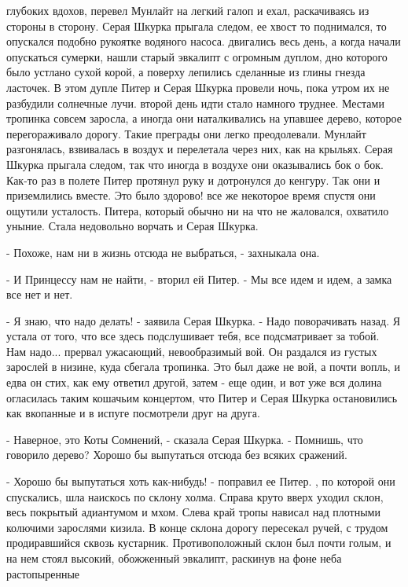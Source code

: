 глубоких вдохов, перевел Мунлайт на легкий галоп и ехал, раскачиваясь 
из стороны в сторону. Серая Шкурка прыгала следом, ее хвост то 
поднимался, то опускался подобно рукоятке водяного насоса.
 двигались весь день, а когда начали опускаться сумерки, нашли 
старый эвкалипт с огромным дуплом, дно которого было устлано сухой 
корой, а поверху лепились сделанные из глины гнезда ласточек. В этом 
дупле Питер и Серая Шкурка провели ночь, пока утром их не разбудили 
солнечные лучи.
 второй день идти стало намного труднее. Местами тропинка совсем 
заросла, а иногда они наталкивались на упавшее дерево, которое 
перегораживало дорогу. Такие преграды они легко преодолевали. Мунлайт 
разгонялась, взвивалась в воздух и перелетала через них, как на 
крыльях. Серая Шкурка прыгала следом, так что иногда в воздухе они 
оказывались бок о бок. Как-то раз в полете Питер протянул руку и 
дотронулся до кенгуру. Так они и приземлились вместе. Это было 
здорово!
 все же некоторое время спустя они ощутили усталость. Питера, 
который обычно ни на что не жаловался, охватило уныние. Стала 
недовольно ворчать и Серая Шкурка.
\par- Похоже, нам ни в жизнь отсюда не выбраться, - захныкала она.
\par- И Принцессу нам не найти, - вторил ей Питер. - Мы все идем и 
идем, а замка все нет и нет.
\par- Я знаю, что надо делать! - заявила Серая Шкурка. - Надо 
поворачивать назад. Я устала от того, что все здесь подслушивает тебя, 
все подсматривает за тобой. Нам надо...
 прервал ужасающий, невообразимый вой. Он раздался из густых 
зарослей в низине, куда сбегала тропинка. Это был даже не вой, а почти 
вопль, и едва он стих, как ему ответил другой, затем - еще один, и вот 
уже вся долина огласилась таким кошачьим концертом, что Питер и Серая 
Шкурка остановились как вкопанные и в испуге посмотрели друг на друга.
\par- Наверное, это Коты Сомнений, - сказала Серая Шкурка. - Помнишь, 
что говорило дерево? Хорошо бы выпутаться отсюда без всяких сражений.
\par- Хорошо бы выпутаться хоть как-нибудь! - поправил ее Питер.
, по которой они спускались, шла наискось по склону холма. 
Справа круто вверх уходил склон, весь покрытый адиантумом и мхом. 
Слева край тропы нависал над плотными колючими зарослями кизила. В 
конце склона дорогу пересекал ручей, с трудом продиравшийся сквозь 
кустарник. Противоположный склон был почти голым, и на нем стоял 
высокий, обожженный эвкалипт, раскинув на фоне неба растопыренные 
